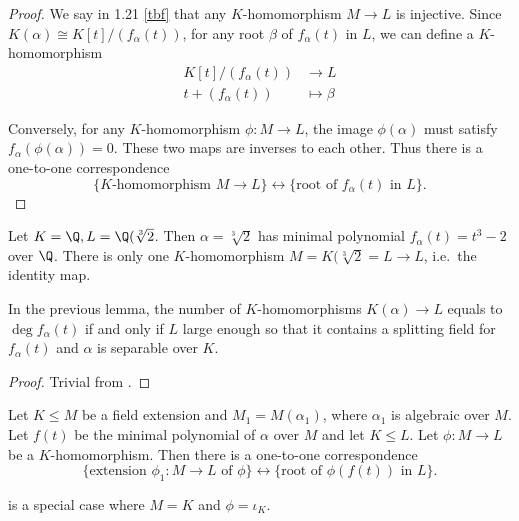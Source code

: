 \documentclass[a4paper]{article}
\begin{document}
\begin{proof}
  We say in 1.21 \ref{tbf} that any \(K\)-homomorphism \(M \to L\) is injective. Since \(K(\alpha) \cong K[t]/(f_\alpha(t))\), for any root \(\beta\) of \(f_\alpha(t)\) in \(L\), we can define a \(K\)-homomorphism
  \begin{align*}
    K[t]/(f_\alpha(t)) &\to L \\
    t + (f_\alpha(t)) &\mapsto \beta
  \end{align*}

  Conversely, for any \(K\)-homomorphism \(\phi: M \to L\), the image \(\phi(\alpha)\) must satisfy \(f_\alpha(\phi(\alpha)) = 0\). These two maps are inverses to each other. Thus there is a one-to-one correspondence
  \[
    \{K\text{-homomorphism } M \to L\} \leftrightarrow \{\text{root of } f_\alpha(t) \text{ in } L\}.
  \]
\end{proof}

\begin{eg}
  Let \(K = \Q, L = \Q(\sqrt[3]{2}\). Then \(\alpha = \sqrt[3]{2}\) has minimal polynomial \(f_\alpha(t) = t^3 - 2\) over \(\Q\). There is only one \(K\)-homomorphism \(M = K(\sqrt[3]{2} = L \to L\), i.e.\ the identity map.
\end{eg}

\begin{corollary}
  In the previous lemma, the number of \(K\)-homomorphisms \(K(\alpha) \to L\) equals to \(\deg f_\alpha(t)\) if and only if \(L\) large enough so that it contains a splitting field for \(f_\alpha(t)\) and \(\alpha\) is separable over \(K\).
\end{corollary}

\begin{proof}
  Trivial from .
\end{proof}

\begin{lemma}
  \label{lem:homomorphic extension of algebraic extension}
  Let \(K \leq M\) be a field extension and \(M_1 = M(\alpha_1)\), where \(\alpha_1\) is algebraic over \(M\). Let \(f(t)\) be the minimal polynomial of \(\alpha\) over \(M\) and let \(K \leq L\). Let \(\phi: M \to L\) be a \(K\)-homomorphism. Then there is a one-to-one correspondence
  \[
    \{\text{extension } \phi_1: M \to L \text{ of } \phi\} \leftrightarrow \{\text{root of } \phi(f(t)) \text{ in } L\}.
  \]
\end{lemma}

\begin{remark}
   is a special case where \(M = K\) and \(\phi = \iota_K\).
\end{remark}
\end{document}
